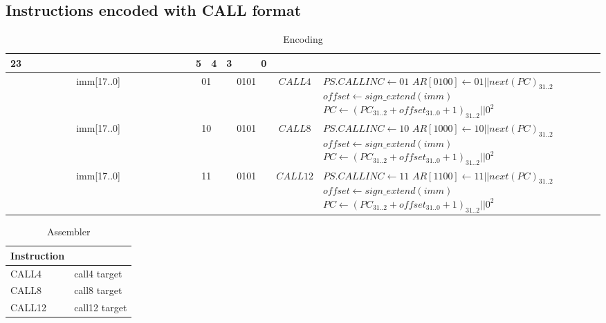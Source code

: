 \subsection{Instructions encoded with CALL format}
\begin{longtable}{llllllllllllllllllllllll  p{1cm}  p{7cm} | }
	\caption{Encoding\label{long}}\\
	23 & & & & & & & & & & & & & & & & & & 5 & 4 & 3 & & & 0 & &
	\multicolumn{1}{c}{}\\
	\hline
	\multicolumn{18}{|c|}{imm[17..0]} & \multicolumn{2}{c|}{01} & \multicolumn{4}{c|}{0101} & \multicolumn{1}{c|}{$CALL4$} & $PS.CALLINC \leftarrow {01}$ \newline $AR[0100] \leftarrow 01||next(PC)_{31..2}$ \newline $offset \leftarrow sign\_extend(imm)$ \newline $PC \leftarrow (PC_{31..2}+offset_{31..0}+1)_{31..2}||0^2$\\ \hline
	\multicolumn{18}{|c|}{imm[17..0]} & \multicolumn{2}{c|}{10} & \multicolumn{4}{c|}{0101} & \multicolumn{1}{c|}{$CALL8$} &$PS.CALLINC \leftarrow {10}$ \newline $AR[1000] \leftarrow 10||next(PC)_{31..2}$ \newline $offset \leftarrow sign\_extend(imm)$ \newline $PC \leftarrow (PC_{31..2}+offset_{31..0}+1)_{31..2}||0^2$\\ \hline
	\multicolumn{18}{|c|}{imm[17..0]} & \multicolumn{2}{c|}{11} & \multicolumn{4}{c|}{0101} & \multicolumn{1}{c|}{$CALL12$} & $PS.CALLINC \leftarrow {11}$ \newline $AR[1100] \leftarrow 11||next(PC)_{31..2}$ \newline $offset \leftarrow sign\_extend(imm)$ \newline $PC \leftarrow (PC_{31..2}+offset_{31..0}+1)_{31..2}||0^2$\\ \hline
\end{longtable}

\begin{longtable}{|p{5cm}|p{5cm}|}
	\caption{Assembler\label{long}}\\
	\hline
	Instruction & \\
	\hline
	CALL4 & call4 target\\ \hline
	CALL8 & call8 target\\ \hline
	CALL12 & call12 target\\ \hline
\end{longtable}

